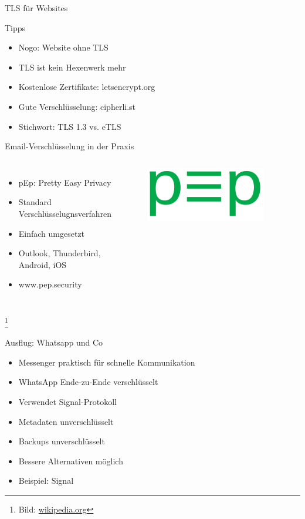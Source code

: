 \documentclass[10pt]{beamer}
\newcommand\blfootnote[1]{%
	\begingroup
	\renewcommand\thefootnote{}\footnote{#1}%
	\addtocounter{footnote}{-1}%
	\endgroup
}
\begin{document}
\begin{frame}[fragile]{TLS für Websites}
\begin{alertblock}{Tipps}
\end{alertblock}
	\begin{itemize}
	\item Nogo: Website ohne TLS
	\item TLS ist kein Hexenwerk mehr
	\item Kostenlose Zertifikate: letsencrypt.org
	\item Gute Verschlüsselung: cipherli.st
	\item Stichwort: TLS 1.3 vs. eTLS
\end{itemize}
\end{frame}

%
%
\begin{frame}[fragile]{Email-Verschlüsselung in der Praxis}
\begin{columns}[T,c,onlytextwidth]
	\begin{itemize}
		\item pEp: Pretty Easy Privacy
		\item Standard Verschlüsselugnsverfahren
		\item Einfach umgesetzt
		\item Outlook, Thunderbird, Android, iOS
		\item www.pep.security
	\end{itemize}
	\begin{figure}
		\includegraphics[width=0.9\textwidth]{images/pep}
	\end{figure}
\end{columns}
\blfootnote{Bild: \href{https://de.wikipedia.org/wiki/Pretty_Easy_privacy}{wikipedia.org}}
\end{frame}

%
%
\begin{frame}[fragile]{Ausflug: Whatsapp und Co}
	\begin{itemize}
	\item Messenger praktisch für schnelle Kommunikation
	\item WhatsApp Ende-zu-Ende verschlüsselt
	\item Verwendet Signal-Protokoll
	\item Metadaten unverschlüsselt
	\item Backups unverschlüsselt
	\item Bessere Alternativen möglich
	\item Beispiel: Signal
\end{itemize}
\end{frame}
\end{document}
